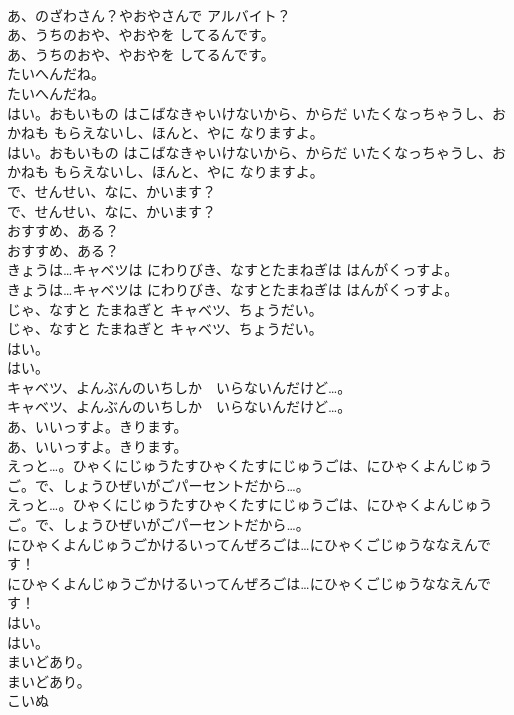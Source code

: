 \documentclass[8pt]{extreport}
\begin{document}
\begin{CJK}{UTF8}{min}
\\	あ、のざわさん？やおやさんで アルバイト？ 
\\	あ、うちのおや、やおやを してるんです。	
\\	あ、うちのおや、やおやを してるんです。 
\\	たいへんだね。	
\\	たいへんだね。 
\\	はい。おもいもの はこばなきゃいけないから、からだ いたくなっちゃうし、おかねも もらえないし、ほんと、やに なりますよ。	
\\	はい。おもいもの はこばなきゃいけないから、からだ いたくなっちゃうし、おかねも もらえないし、ほんと、やに なりますよ。 
\\	で、せんせい、なに、かいます？	
\\	で、せんせい、なに、かいます？ 
\\	おすすめ、ある？	
\\	おすすめ、ある？ 
\\	きょうは…キャベツは にわりびき、なすとたまねぎは はんがくっすよ。	
\\	きょうは…キャベツは にわりびき、なすとたまねぎは はんがくっすよ。 
\\	じゃ、なすと たまねぎと キャベツ、ちょうだい。	
\\	じゃ、なすと たまねぎと キャベツ、ちょうだい。 
\\	はい。	
\\	はい。 
\\	キャベツ、よんぶんのいちしか　いらないんだけど…。	
\\	キャベツ、よんぶんのいちしか　いらないんだけど…。 
\\	あ、いいっすよ。きります。	
\\	あ、いいっすよ。きります。 
\\	えっと…。ひゃくにじゅうたすひゃくたすにじゅうごは、にひゃくよんじゅうご。で、しょうひぜいがごパーセントだから…。	
\\	えっと…。ひゃくにじゅうたすひゃくたすにじゅうごは、にひゃくよんじゅうご。で、しょうひぜいがごパーセントだから…。 
\\	にひゃくよんじゅうごかけるいってんぜろごは…にひゃくごじゅうななえんです！	
\\	にひゃくよんじゅうごかけるいってんぜろごは…にひゃくごじゅうななえんです！ 
\\	はい。	
\\	はい。 
\\	まいどあり。	
\\	まいどあり。 
\\	こいぬ

\end{CJK}
\end{document}
